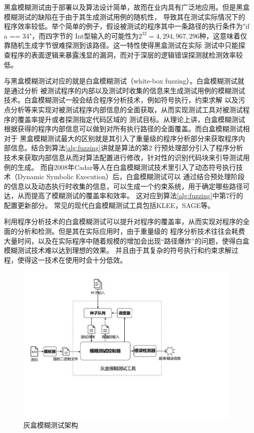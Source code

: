 \documentclass[bachelor]{njupthesis}
\begin{document}
黑盒模糊测试由于部署以及算法设计简单，故而在业内具有广泛地应用。但是黑盒模糊测试的缺陷在于由于其生成测试用例的随机性，
导致其在测试实际情况下的程序效率较低。举个简单的例子，假设被测试的程序其中一条路径的执行条件为"if a == 34"，而四字节的
Int型输入的可能性为$2^{32}=4,294,967,296$种，这意味着仅靠随机生成字节很难探测到该路径。这一特性使得黑盒测试在实际
测试中只能探查程序的表面逻辑来暴露浅显的漏洞，而对于深层的逻辑错误探测就检测效率较低。

与黑盒模糊测试对应的就是白盒模糊测试\cite{godefroid2008automated}（white-box fuzzing）。白盒模糊测试就是通过分析
被测试程序的内部以及测试时收集的信息来生成测试用例的模糊测试技术。白盒模糊测试一般会结合程序分析技术，例如符号执行，约束求解
以及污点分析等来实现对被测试程序内部信息的全面获取，从而实现测试工具对被测试程序的覆盖率提升或者探测指定代码区域的
测试目标。从理论上讲，白盒模糊测试根据获得的程序内部信息可以做到对所有执行路径的全面覆盖。而白盒模糊测试相对于
黑盒模糊测试最大的区别就是其引入了重量级的程序分析部分来获取程序内部信息。结合到算法\ref{alg:fuzzing}讲就是算法的第2
行预处理部分引入了程序分析技术来获取内部信息从而对算法配置进行修改，针对性的识别代码块来引导测试用例的生成\cite{godefroid2008automated}。
而自2008年Cadar等人在白盒模糊测试技术里引入了动态符号执行技术（Dynamic Symbolic Execution）\cite{cadar2008klee}后，白盒模糊测试可以
通过结合预处理阶段的信息以及动态执行时收集的信息，可以生成一个约束系统，用于确定哪些路径可达，从而提高了模糊测试的覆盖率和效率。
这对应到算法\ref{alg:fuzzing}中第7行的配置更新部分。
常见的现代白盒模糊测试工具包括KLEE\cite{cadar2008klee}，SAGE\cite{sage}等。

利用程序分析技术的白盒模糊测试可以提升对程序的覆盖率，从而实现对程序的全面的分析和检测。但是其在实际应用时，由于重量级的
程序分析技术往往会耗费大量时间，以及在实际程序中随着规模的增加会出现“路径爆炸”的问题，使得白盒模糊测试技术难以达到理想的效果。
并且由于其复杂的符号执行和约束求解过程，使得这一技术在使用时会十分低效。

\begin{figure}[htbp]
	\centering
	\includegraphics[width=1\textwidth]{pic/GF.pdf}
	\caption{灰盒模糊测试架构}
 	\label{GF}
\end{figure}
\end{document}
